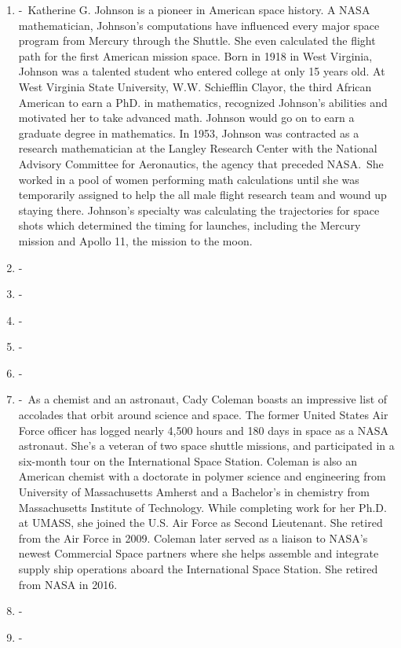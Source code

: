 \documentclass[12pt,a4paper]{article}
\begin{document}
\begin{enumerate}
  \item {} -\ Katherine G. Johnson is a pioneer in American space history. A NASA mathematician, Johnson's computations have influenced every major space program from Mercury through the Shuttle. She even calculated the flight path for the first American mission space. Born in 1918 in West Virginia, Johnson was a talented student who entered college at only 15 years old. At West Virginia State University, W.W. Schiefflin Clayor, the third African American to earn a PhD. in mathematics, recognized Johnson's abilities and motivated her to take advanced math. Johnson would go on to earn a graduate degree in mathematics. In 1953, Johnson was contracted as a research mathematician at the Langley Research Center with the National Advisory Committee for Aeronautics, the agency that preceded NASA.\ She worked in a pool of women performing math calculations until she was temporarily assigned to help the all male flight research team and wound up staying there. Johnson's specialty was calculating the trajectories for space shots which determined the timing for launches, including the Mercury mission and Apollo 11, the mission to the moon.
  \item {} -\
  \item {} -\
  \item {} -\
  \item {} -\
  \item {} -\
  \item {} -\ As a chemist and an astronaut, Cady Coleman boasts an impressive list of accolades that orbit around science and space. The former United States Air Force officer has logged nearly 4,500 hours and 180 days in space as a NASA astronaut. She's a veteran of two space shuttle missions, and participated in a six-month tour on the International Space Station. Coleman is also an American chemist with a doctorate in polymer science and engineering from University of Massachusetts Amherst and a Bachelor's in chemistry from Massachusetts Institute of Technology. While completing work for her Ph.D. at UMASS, she joined the U.S. Air Force as Second Lieutenant. She retired from the Air Force in 2009. Coleman later served as a liaison to NASA's newest Commercial Space partners where she helps assemble and integrate supply ship operations aboard the International Space Station. She retired from NASA in 2016.
  \item \imp{Ellen Ochoa} -\
  \item {} -\
\end{enumerate}
\end{document}
